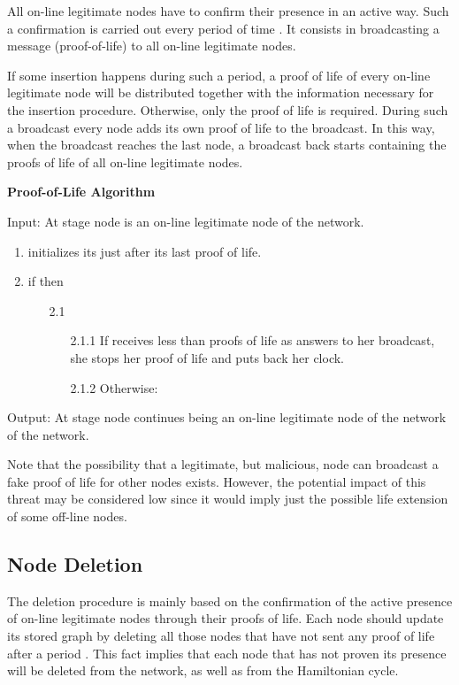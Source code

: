 \documentclass{article}
\begin{document}
All on-line legitimate nodes have to confirm their presence in an active way. Such a confirmation is carried out every period of time . It consists in broadcasting a message (proof-of-life) to all on-line legitimate nodes.

If some insertion happens during such a period, a proof of life of every on-line legitimate node will be distributed together with the information necessary for the insertion procedure. Otherwise, only the proof of life is required. During such a broadcast every node adds its own proof of life to the broadcast. In this way, when the broadcast reaches the last node, a broadcast back starts containing the proofs of life of all on-line legitimate nodes.

{\bf Proof-of-Life Algorithm}

Input: At stage  node  is an on-line legitimate node of the
network.
\begin{enumerate}
    \item   initializes its  just after its last proof of
    life.
    \item  if  then
    \begin{itemize}
        \item [2.1]    
        \begin {itemize}
               \item [2.1.1] If  receives less than  proofs of life as answers to her broadcast, she stops 									her proof of life and puts back her clock.
      					\item [2.1.2] Otherwise:    
				\end {itemize}    
    \end{itemize}
\end{enumerate}

Output:  At stage  node  continues being an on-line
legitimate node of the network of the network.

Note that the possibility that a legitimate, but malicious, node can broadcast a fake proof of life for other nodes exists.  However, the potential impact of this threat may be considered low since it would imply just the possible life extension of some off-line nodes.

\subsection{Node Deletion}


The deletion procedure is mainly based on the confirmation of the
active presence of on-line legitimate nodes through their proofs
of life. Each node should update its stored graph by deleting all
those nodes that have not sent any proof of life after a period
. This fact implies that each node that has not proven its presence
will be deleted from the network, as well as from the Hamiltonian cycle.
\end{document}
